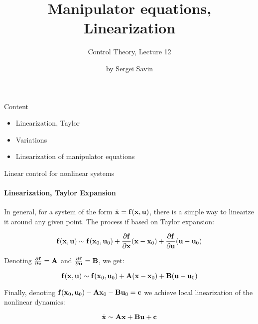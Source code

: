 \documentclass{beamer}
\title{Manipulator equations, Linearization}
\subtitle{Control Theory, Lecture 12}
\author{by Sergei Savin}
\date{\mydate}
\begin{document}
\maketitle


\begin{frame}{Content}
\begin{itemize}
\item Linearization, Taylor
\item Variations
\item Linearization of manipulator equations
\end{itemize}
\end{frame}






\begin{frame}{Linear control for nonlinear systems}
	\framesubtitle{Linearization, Taylor Expansion}
	\begin{flushleft}
		
		In general, for a system of the form $\dot{\mathbf{x}} = \mathbf{f}(\mathbf{x}, \mathbf{u})$, there is a simple way to linearize it around any given point. The process if based on Taylor expansion:
		
		\begin{equation}
			\mathbf{f}(\mathbf{x}, \mathbf{u}) 	\sim \mathbf{f}(\mathbf{x}_0, \mathbf{u}_0) +
			\frac{\partial \mathbf{f}}{\partial \mathbf{x}} (\mathbf{x} - \mathbf{x}_0) + 
			\frac{\partial \mathbf{f}}{\partial \mathbf{u}} (\mathbf{u} - \mathbf{u}_0)
		\end{equation}
		
		Denoting $\frac{\partial \mathbf{f}}{\partial \mathbf{x}} = \mathbf{A}$ and $\frac{\partial \mathbf{f}}{\partial \mathbf{u}} = \mathbf{B}$, we get:
		
		\begin{equation}
			\mathbf{f}(\mathbf{x}, \mathbf{u}) 	\sim \mathbf{f}(\mathbf{x}_0, \mathbf{u}_0) +
			\mathbf{A} (\mathbf{x} - \mathbf{x}_0) + 
			\mathbf{B} (\mathbf{u} - \mathbf{u}_0)
		\end{equation}
		
		Finally, denoting $ \mathbf{f}(\mathbf{x}_0, \mathbf{u}_0) - \mathbf{A}\mathbf{x}_0 - \mathbf{B} \mathbf{u}_0 = \mathbf{c}$ we achieve local linearization of the nonlinear dynamics:
		
		\begin{equation}
			\dot{\mathbf{x}} \sim \mathbf{A} \mathbf{x} + 
			\mathbf{B} \mathbf{u} + \mathbf{c}
		\end{equation}
		
		
	\end{flushleft}
\end{frame}
\end{document}
